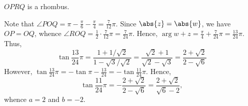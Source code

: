 \begin{solution}
\begin{ppart}
\begin{center}
        \end{center}
        $OPRQ$ is a rhombus.
    \end{ppart}
    \begin{ppart}
        Note that $\angle POQ = \pi - \frac\pi6 - \frac\pi4 = \frac7{12} \pi$. Since $\abs{z} = \abs{w}$, we have $OP = OQ$, whence $\angle ROQ = \frac12 \cdot \frac7{12}\pi = \frac7{24}\pi$. Hence, $\arg{w + z} = \frac\pi4 + \frac7{24}\pi = \frac{13}{24}\pi$. Thus, \[\tan{\frac{13}{24}\pi} = \frac{1 + 1/\sqrt2}{1 - \sqrt3/\sqrt2} = \frac{\sqrt2 + 1}{\sqrt2 - \sqrt3} = \frac{2 + \sqrt2}{2 - \sqrt6}\]
        However, $\tan{\frac{13}{24}\pi} = -\tan{\pi - \frac{13}{24}} = -\tan{\frac{11}{24}\pi}$. Hence, \[\tan{\frac{11}{24}\pi} = -\frac{2 + \sqrt2}{2 - \sqrt6} = \frac{2 + \sqrt2}{\sqrt6 - 2},\] whence $a = 2$ and $b = -2$.
    \end{ppart}
\end{solution}

